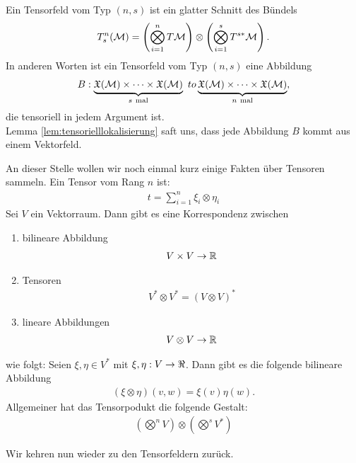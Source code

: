 \begin{defs}[Tensorfeld]
Ein Tensorfeld vom Typ $(n, s)$ ist ein glatter Schnitt des Bündels
\begin{align}
T^{n}_{s} (\mathcal{M}) = \left( \bigotimes^n_{i=1} T \mathcal{M} \right) \otimes \left(\bigotimes^s_{i=1} T^{s*} \mathcal{M}\right).
\end{align}
In anderen Worten ist ein Tensorfeld vom Typ $(n,s)$ eine Abbildung
\begin{align}
B : \underbrace{\mathfrak{X}(\mathcal{M}) \times \cdots \times \mathfrak{X}(\mathcal{M})}_{s \ \mathrm{mal}} \ to \underbrace{\mathfrak{X}(\mathcal{M}) \times \cdots \times \mathfrak{X}(\mathcal{M})}_{n \ \mathrm{mal}},
\end{align}
die tensoriell in jedem Argument ist.\\
Lemma \ref{lem:tensorielllokalisierung} saft uns, dass jede Abbildung $B$ kommt aus einem Vektorfeld.
\end{defs}

An dieser Stelle wollen wir noch einmal kurz einige Fakten über Tensoren sammeln.
Ein Tensor vom Rang $n$ ist:
\begin{align}
t = \sum^n_{i=1} \xi_i \otimes \eta_i
\end{align}
Sei $V$ ein Vektorraum. 
Dann gibt es eine Korrespondenz zwischen
\begin{enumerate}
\item bilineare Abbildung 
\begin{align}
V \times V \to \mathbb{R}
\end{align}
\item Tensoren 
\begin{align}
V^* \otimes V^* = (V \otimes V)^*
\end{align}
\item lineare Abbildungen
\begin{align}
V \otimes V \to \mathbb{R}
\end{align}
\end{enumerate}
wie folgt:
Seien $\xi, \eta \in V^*$ mit $\xi, \eta: V \to \real$.
Dann gibt es die folgende bilineare Abbildung 
\begin{align}
(\xi \otimes \eta)(v, w) = \xi (v) \eta (w).
\end{align}
Allgemeiner hat das Tensorpodukt die folgende Gestalt:
\begin{align}
\left( \bigotimes^n V \right) \otimes \left( \bigotimes^s V^* \right)
\end{align}


Wir kehren nun wieder zu den Tensorfeldern zurück.


